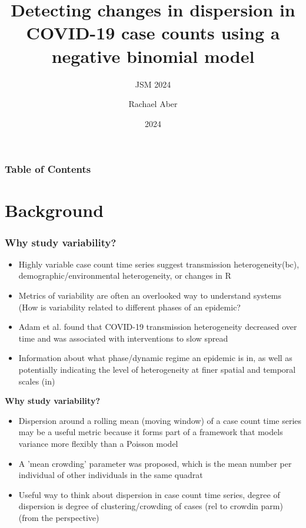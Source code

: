 \documentclass{beamer}
\title{\textbf{Detecting changes in dispersion in COVID-19 case counts using a negative binomial model}}
\subtitle{JSM 2024}
\author{Rachael Aber}
\date{2024}
\begin{document}
\frame{\titlepage}

\begin{frame}
	\frametitle{Table of Contents}
	\tableofcontents
\end{frame}

\section{Background}
	
\begin{frame}
\frametitle{Why study variability?}
\begin{itemize}[<+-| alert@+>] %
			\item Highly variable case count time series suggest transmission heterogeneity(bc), demographic/environmental heterogeneity, or changes in R
			\item Metrics of variability are often an overlooked way to understand systems (How is variability related to different phases of an epidemic? \cite{graham_measles_2019}
			\item Adam et al. \cite{adam_time-varying_2022} found that COVID-19 transmission heterogeneity decreased over time and was associated with interventions to slow spread
			\item Information about what phase/dynamic regime an epidemic is in, as well as potentially indicating the level of heterogeneity at finer spatial and temporal scales (in)
	\end{itemize}
\end{frame}

\begin{frame}{\textbf{Why study variability?}}
	\begin{itemize}[<+-| alert@+>] 
		\item Dispersion around a rolling mean (moving window) of a case count time series may be a useful metric because it forms part of a framework that models variance more flexibly than a Poisson model
		\item A 'mean crowding' parameter \cite{lloyd_mean_1967} was proposed, which is the mean number per individual of other individuals in the same quadrat 
		\item Useful way to think about dispersion in case count time series, degree of dispersion is degree of clustering/crowding of cases (rel to crowdin parm) (from the perspective)
	\end{itemize}
\end{frame}
\end{document}
